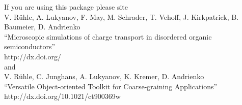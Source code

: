 \begin{titlepage}


\vspace*{1cm}

\vspace*{3cm}
\vspace*{1cm}

\vfill
{\small%
If you are using this package please site \\
\vspace*{0.1cm}
V. R\"uhle, A. Lukyanov, F. May, M. Schrader, T. Vehoff, J. Kirkpatrick, B. Baumeier, D. Andrienko \\
``Microscopic simulations of charge transport in disordered organic semiconductors'' \\
{http://dx.doi.org/} \\
\vspace*{0.1cm}
and \\
\vspace*{0.1cm}
V. R\"uhle, C. Junghans, A. Lukyanov, K. Kremer, D. Andrienko \\
``Versatile Object-oriented Toolkit for Coarse-graining Applications'' \\
{http://dx.doi.org/10.1021/ct900369w}
}

\vspace*{1.4cm}
\center{\large{\today}}




\end{titlepage}
